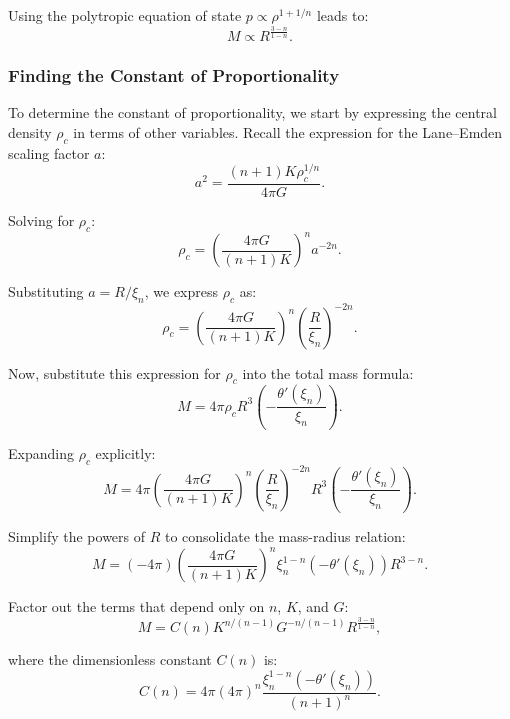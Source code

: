 \documentclass[12pt]{article}
\begin{document}
Using the polytropic equation of state \(p \propto \rho^{1 + 1/n}\) leads to:
\[
M \propto R^{\frac{3 - n}{1 - n}}.
\]


\subsubsection{Finding the Constant of Proportionality}

To determine the constant of proportionality, we start by expressing the central density \(\rho_c\) in terms of other variables. Recall the expression for the Lane–Emden scaling factor \(a\):
\[
a^2 = \frac{(n+1)K\rho_c^{1/n}}{4\pi G}.
\]

Solving for \(\rho_c\):
\[
\rho_c = \left(\frac{4\pi G}{(n+1)K}\right)^n a^{-2n}.
\]

Substituting \(a = R / \xi_n\), we express \(\rho_c\) as:
\[
\rho_c = \left(\frac{4\pi G}{(n+1)K}\right)^n \left(\frac{R}{\xi_n}\right)^{-2n}.
\]

Now, substitute this expression for \(\rho_c\) into the total mass formula:
\[
M = 4\pi \rho_c R^3 \left(-\frac{\theta'(\xi_n)}{\xi_n}\right).
\]

Expanding \(\rho_c\) explicitly:
\[
M = 4\pi \left(\frac{4\pi G}{(n+1)K}\right)^n \left(\frac{R}{\xi_n}\right)^{-2n} R^3 \left(-\frac{\theta'(\xi_n)}{\xi_n}\right).
\]

Simplify the powers of \(R\) to consolidate the mass-radius relation:
\[
M = \left(-4\pi \right) \left(\frac{4\pi G}{(n+1)K}\right)^n \xi_n^{1-n} \left(-\theta'(\xi_n)\right) R^{3-n}.
\]

Factor out the terms that depend only on \(n\), \(K\), and \(G\):
\[
M = C(n) K^{n/(n-1)} G^{-n/(n-1)} R^{\frac{3-n}{1-n}},
\]

where the dimensionless constant \(C(n)\) is:
\[
C(n) = 4\pi \left(4\pi\right)^n \frac{\xi_n^{1-n} \left(-\theta'(\xi_n)\right)}{(n+1)^n}.
\]
\end{document}
